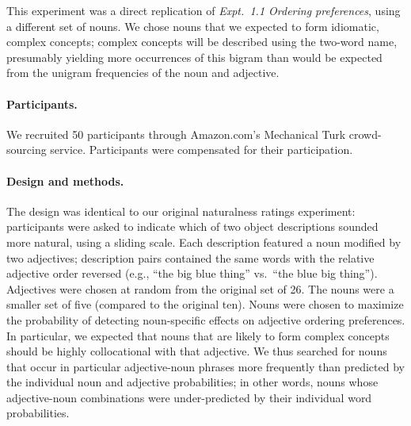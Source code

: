 \documentclass[12pt]{article}
\begin{document}
This experiment was a direct replication of \emph{Expt.~1.1 Ordering preferences}, using a different set of nouns. We chose nouns that we expected to form idiomatic, complex concepts; complex concepts will be described using the two-word name, presumably yielding more occurrences of this bigram than would be expected from the unigram frequencies of the noun and adjective. %

\paragraph{Participants.}

We recruited 50 participants through Amazon.com's Mechanical Turk crowd-sourcing service. Participants were compensated for their participation.

\paragraph{Design and methods.}

The design was identical to our original naturalness ratings experiment: participants were asked to indicate which of two object descriptions sounded more natural, using a sliding scale. Each description featured a noun modified by two adjectives; description pairs contained the same words with the relative adjective order reversed (e.g., ``the big blue thing'' vs.~``the blue big thing''). Adjectives were chosen at random from the original set of 26. The nouns were a smaller set of five (compared to the original ten). Nouns were chosen to maximize the probability of detecting noun-specific effects on adjective ordering preferences. In particular, we expected that nouns that are likely to form complex concepts should be 
highly collocational with that adjective. We thus searched for nouns that occur in particular adjective-noun phrases more frequently than predicted by the individual noun and adjective probabilities; in other words, nouns whose adjective-noun combinations were under-predicted by their individual word probabilities. 
\end{document}
